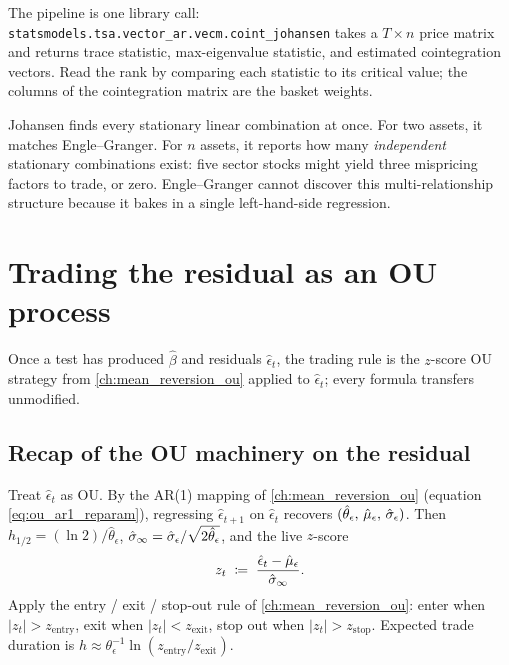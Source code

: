 The pipeline is one library call:
\texttt{statsmodels.tsa.vector\_ar.vecm.coint\_johansen} takes a
$T\times n$ price matrix and returns trace statistic,
max-eigenvalue statistic, and estimated cointegration vectors.
Read the rank by comparing each statistic to its critical value;
the columns of the cointegration matrix are the basket weights.

\begin{intuitionbox}
Johansen finds every stationary linear combination at once. For
two assets, it matches Engle--Granger. For $n$ assets, it reports
how many \emph{independent} stationary combinations exist: five
sector stocks might yield three mispricing factors to trade, or
zero. Engle--Granger cannot discover this multi-relationship
structure because it bakes in a single left-hand-side regression.
\end{intuitionbox}

\section{Trading the residual as an OU process}
\label{sec:ch10_trading}

Once a test has produced $\hat\beta$ and residuals
$\hat\epsilon_t$, the trading rule is the $z$-score OU strategy
from \cref{ch:mean_reversion_ou} applied to $\hat\epsilon_t$;
every formula transfers unmodified.

\subsection{Recap of the OU machinery on the residual}
\label{subsec:ch10_recap_ou}

Treat $\hat\epsilon_t$ as OU. By the AR(1) mapping of
\cref{ch:mean_reversion_ou} (equation
\eqref{eq:ou_ar1_reparam}), regressing $\hat\epsilon_{t+1}$ on
$\hat\epsilon_t$ recovers
$(\hat\theta_\epsilon,\, \hat\mu_\epsilon,\, \hat{\sigma}_\epsilon)$.
Then $h_{1/2} = (\ln 2)/\hat\theta_\epsilon$,
$\hat\sigma_\infty = \hat{\sigma}_\epsilon/\sqrt{2\hat\theta_\epsilon}$,
and the live $z$-score
\begin{equation}
  z_t \;\coloneqq\; \frac{\hat\epsilon_t - \hat\mu_\epsilon}
                      {\hat\sigma_\infty}.
  \label{eq:residual_z}
\end{equation}
Apply the entry / exit / stop-out rule of
\cref{ch:mean_reversion_ou}: enter when $|z_t| > z_{\text{entry}}$,
exit when $|z_t| < z_{\text{exit}}$, stop out when
$|z_t| > z_{\text{stop}}$. Expected trade duration is
$h \approx \theta_\epsilon^{-1}\ln(z_{\text{entry}}/z_{\text{exit}})$.

